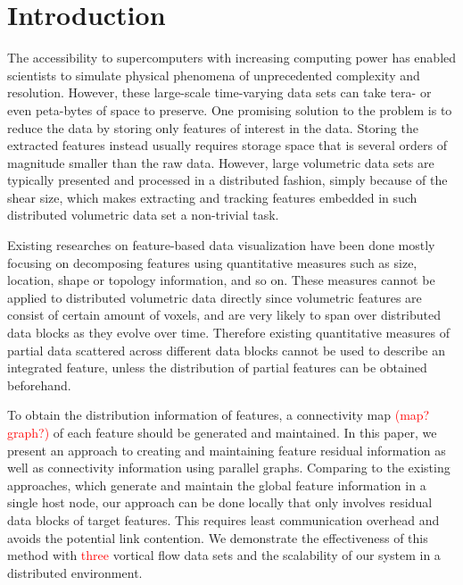 \documentclass[10pt, conference, compsocconf]{IEEEtran}
\begin{document}
\section{Introduction}

The accessibility to supercomputers with increasing computing power has enabled scientists to simulate physical phenomena of unprecedented complexity and resolution. However, these large-scale time-varying data sets can take tera- or even peta-bytes of space to preserve. One promising solution to the problem is to reduce the data by storing only features of interest in the data. Storing the extracted features instead usually requires storage space that is several orders of magnitude smaller than the raw data. However, large volumetric data sets are typically presented and processed in a distributed fashion, simply because of the shear size, which makes extracting and tracking features embedded in such distributed volumetric data set a non-trivial task. 

Existing researches on feature-based data visualization have been done mostly focusing on decomposing features using quantitative measures such as size, location, shape or topology information, and so on. These measures cannot be applied to distributed volumetric data directly since volumetric features are consist of certain amount of voxels, and are very likely to span over distributed data blocks as they evolve over time. Therefore existing quantitative measures of partial data scattered across different data blocks cannot be used to describe an integrated feature, unless the distribution of partial features can be obtained beforehand.

To obtain the distribution information of features, a connectivity map \textcolor{red}{(map? graph?)} of each feature should be generated and maintained. In this paper, we present an approach to creating and maintaining feature residual information as well as connectivity information using parallel graphs. Comparing to the existing approaches, which generate and maintain the global feature information in a single host node, our approach can be done locally that only involves residual data blocks of target features. This requires least communication overhead and avoids the potential link contention. We demonstrate the effectiveness of this method with \textcolor{red}{three} vortical flow data sets and the scalability of our system in a distributed environment.
\end{document}

